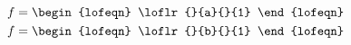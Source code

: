 \documentclass[preview]{standalone}
\begin{document}
	


\begin{eqnarray}
	f = \begin{lofeqn} \loflr{}{a}{}{1} \end{lofeqn}\\
	f = \begin{lofeqn} \loflr{}{b}{}{1} \end{lofeqn}
\end{eqnarray}

%
%
%	
%	
%	
%
%
%
\end{document}
